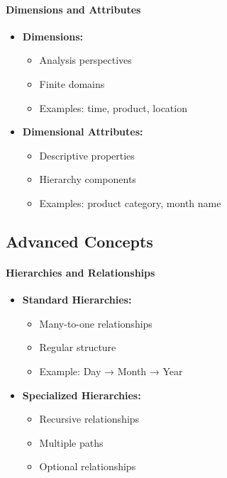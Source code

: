 \documentclass[a4paper,11pt]{article}
\begin{document}
\paragraph{Dimensions and Attributes}
\begin{itemize}
    \item \textbf{Dimensions:}
        \begin{itemize}
            \item Analysis perspectives
            \item Finite domains
            \item Examples: time, product, location
        \end{itemize}
    \item \textbf{Dimensional Attributes:}
        \begin{itemize}
            \item Descriptive properties
            \item Hierarchy components
            \item Examples: product category, month name
        \end{itemize}
\end{itemize}

\subsection{Advanced Concepts}

\paragraph{Hierarchies and Relationships}
\begin{itemize}
    \item \textbf{Standard Hierarchies:}
        \begin{itemize}
            \item Many-to-one relationships
            \item Regular structure
            \item Example: Day → Month → Year
        \end{itemize}
    \item \textbf{Specialized Hierarchies:}
        \begin{itemize}
            \item Recursive relationships
            \item Multiple paths
            \item Optional relationships
        \end{itemize}
\end{itemize}
\end{document}

